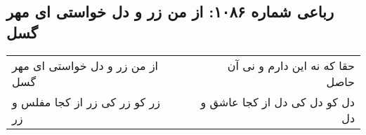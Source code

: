 \begin{center}
\section*{رباعی شماره ۱۰۸۶: از من زر و دل خواستی ای مهر گسل}
\label{sec:1086}
\begin{longtable}{l p{0.5cm} r}
از من زر و دل خواستی ای مهر گسل
&&
حقا که نه این دارم و نی آن حاصل
\\
زر کو زر کی زر از کجا مفلس و زر
&&
دل کو دل کی دل از کجا عاشق و دل
\\
\end{longtable}
\end{center}
